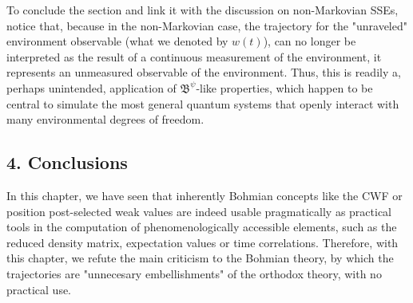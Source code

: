 \documentclass[11pt, a4paper]{article} %
\newcommand{\B}{\mathfrak{B}}
\begin{document}
To conclude the section and link it with the discussion on non-Markovian SSEs, notice that, because in the non-Markovian case, the trajectory for the "unraveled" environment observable (what we denoted by $w(t)$), can no longer be interpreted as the result of a continuous measurement of the environment, it represents an unmeasured observable of the environment. Thus, this is readily a, perhaps unintended, application of $\B^\psi$-like properties, which happen to be central to simulate the most general quantum systems that openly interact with many environmental degrees of freedom. \vspace{-0.2cm}

\subsection*{4. Conclusions}\vspace{-0.15cm}

In this chapter, we have seen that inherently Bohmian concepts like the CWF or position post-selected weak values are indeed usable pragmatically as practical tools in the computation of phenomenologically accessible elements, such as the reduced density matrix, expectation values or time correlations. Therefore, with this chapter, we refute the main criticism to the Bohmian theory, by which the trajectories are "unnecesary embellishments" of the orthodox theory, with no practical use.
\end{document}
